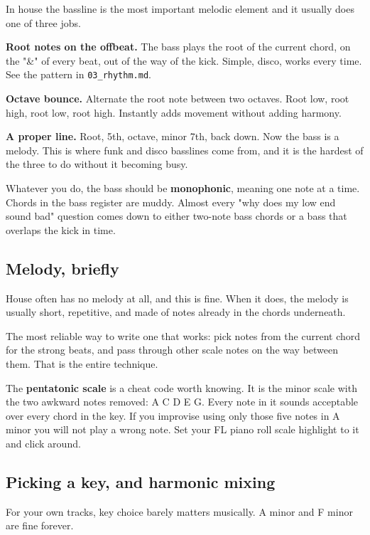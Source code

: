 In house the bassline is the most important melodic element and it usually does one of
three jobs.

\textbf{Root notes on the offbeat.} The bass plays the root of the current chord, on the "\&" of
every beat, out of the way of the kick. Simple, disco, works every time. See the pattern in
\texttt{03\_rhythm.md}.

\textbf{Octave bounce.} Alternate the root note between two octaves. Root low, root high, root
low, root high. Instantly adds movement without adding harmony.

\textbf{A proper line.} Root, 5th, octave, minor 7th, back down. Now the bass is a melody. This
is where funk and disco basslines come from, and it is the hardest of the three to do
without it becoming busy.

Whatever you do, the bass should be \textbf{monophonic}, meaning one note at a time. Chords in
the bass register are muddy. Almost every "why does my low end sound bad" question comes
down to either two-note bass chords or a bass that overlaps the kick in time.

\subsection{Melody, briefly}\label{th04_harmony-melody-briefly}

House often has no melody at all, and this is fine. When it does, the melody is usually
short, repetitive, and made of notes already in the chords underneath.

The most reliable way to write one that works: pick notes from the current chord for the
strong beats, and pass through other scale notes on the way between them. That is the entire
technique.

The \textbf{pentatonic scale} is a cheat code worth knowing. It is the minor scale with the two
awkward notes removed: A C D E G. Every note in it sounds acceptable over every chord in the
key. If you improvise using only those five notes in A minor you will not play a wrong note.
Set your FL piano roll scale highlight to it and click around.

\subsection{Picking a key, and harmonic mixing}\label{th04_harmony-picking-a-key-and-harmonic-mixing}

For your own tracks, key choice barely matters musically. A minor and F minor are fine
forever.

